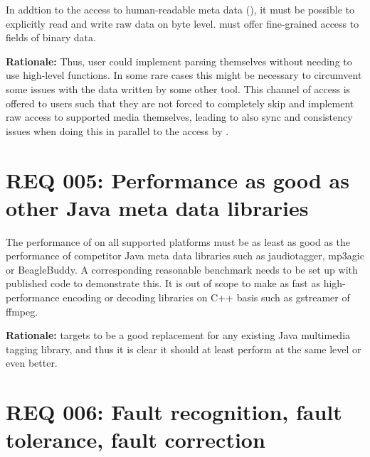 In addtion to the access to human-readable meta data (), it must be possible to explicitly read and write raw data on byte level. \LibName{} must offer fine-grained access to fields of binary data.

\textbf{Rationale:} Thus, user could implement parsing themselves without needing to use high-level functions. In some rare cases this might be necessary to circumvent some issues with the data written by some other tool. This channel of access is offered to users such that they are not forced to completely skip \LibName{} and implement raw access to supported media themselves, leading to also sync and consistency issues when doing this in parallel to the access by \LibName{}.


\section{REQ 005: Performance as good as other Java meta data libraries}
\label{sec:REQ005PerformanceVergleichbarMitAnderenJavaMetadatenLibraries}

The performance of \LibName{} on all supported platforms must be as least as good as the performance of competitor Java meta data libraries such as jaudiotagger, mp3agic or BeagleBuddy. A corresponding reasonable benchmark needs to be set up with published code to demonstrate this. It is out of scope to make \LibName{} as fast as high-performance encoding or decoding libraries on C++ basis such as gstreamer of ffmpeg.

\textbf{Rationale:} \LibName{} targets to be a good replacement for any existing Java multimedia tagging library, and thus it is clear it should at least perform at the same level or even better.


\section{REQ 006: Fault recognition, fault tolerance, fault correction}
\label{sec:REQ006FehlererkennungFehlertoleranzFehlerkorrektur}

